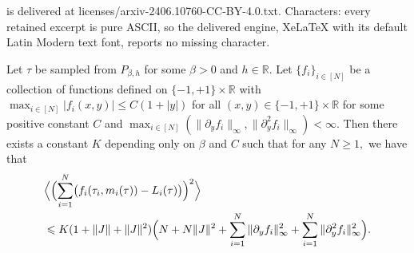 \documentclass[10pt,a4paper]{amsart}
\renewcommand{\geq}{\geqslant}
\newcommand{\la}{\langle}
\renewcommand{\leq}{\leqslant}
\newcommand{\mvgt}{{\tau}}
\newcommand{\ra}{\rangle}
\begin{document}
is delivered at licenses/arxiv-2406.10760-CC-BY-4.0.txt. Characters: every retained excerpt is pure ASCII, so the delivered engine, XeLaTeX with its default Latin Modern text font, reports no missing character.
\begin{lem} \label{lem:new-concent}
Let $\mvgt$ be sampled from $P_{\beta, h}$ for some $\beta>0$ and $h\in \mathbb{R}$.
Let $\{f_i\}_{i\in [N]}$ be a collection of functions defined on $\{-1,+1\}\times \mathbb{R}$ with $\max_{i\in [N]}|f_i(x,y)|\leq C(1+|y|)$ for all $(x,y)\in \{-1,+1\}\times\mathbb{R}$ for some positive constant $C$ and $\max_{i\in [N]}(\|\partial_yf_i\|_\infty,\|\partial_{y}^2f_i\|_\infty)<\infty.$
Then there exists a constant $K$ depending only on $\beta$ and $C$ such that for any $N\geq 1,$ we have that 
    \begin{align*}
&\Bigl\la\Bigl(\sum_{i=1}^N\bigl(f_i(\tau_i,m_i(\mvgt))-L_i(\mvgt)\bigr)\Bigr)^2 \Bigr\ra\\
&\leq K(1+\|J\|+\|J\|^2)\Bigl(N+N\|J\|^2+\sum_{i=1}^N\|\partial_y f_i\|_\infty^2+\sum_{i=1}^N\|\partial_y^2f_i\|_\infty^2\Bigr).
\end{align*}
\end{lem}
\end{document}

